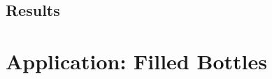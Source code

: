 \documentclass[a4paper,12pt]{article}
\begin{document}

\subsection{Results}


\newpage

\section{Application: Filled Bottles}

\end{document}
